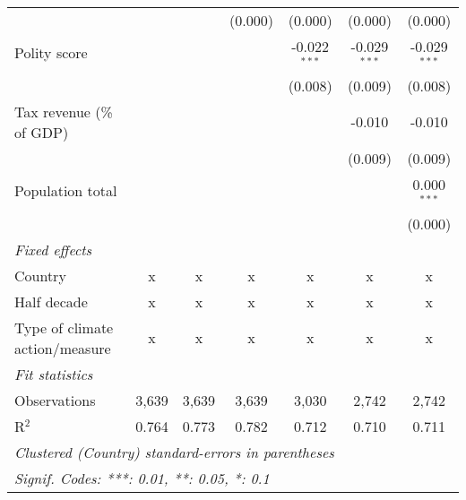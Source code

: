 \begin{tabular}{lcccccc}
                                                                                &         &                & (0.000)        & (0.000)        & (0.000)        & (0.000)\\   
   Polity score                                                                 &         &                &                & -0.022$^{***}$ & -0.029$^{***}$ & -0.029$^{***}$\\   
                                                                                &         &                &                & (0.008)        & (0.009)        & (0.008)\\   
   Tax revenue (\% of GDP)                                                      &         &                &                &                & -0.010         & -0.010\\   
                                                                                &         &                &                &                & (0.009)        & (0.009)\\   
   Population total                                                             &         &                &                &                &                & 0.000$^{***}$\\   
                                                                                &         &                &                &                &                & (0.000)\\   
   \emph{Fixed effects}\\
   Country                                                                      & x       & x              & x              & x              & x              & x\\  
   Half decade                                                                  & x       & x              & x              & x              & x              & x\\  
   Type of climate action/measure                                               & x       & x              & x              & x              & x              & x\\  
   \midrule \emph{Fit statistics}\\
   Observations                                                                 & 3,639   & 3,639          & 3,639          & 3,030          & 2,742          & 2,742\\  
   R$^2$                                                                        & 0.764   & 0.773          & 0.782          & 0.712          & 0.710          & 0.711\\  
   \midrule
   \multicolumn{7}{l}{\emph{Clustered (Country) standard-errors in parentheses}}\\
   \multicolumn{7}{l}{\emph{Signif. Codes: ***: 0.01, **: 0.05, *: 0.1}}\\
\end{tabular}
\par\endgroup


